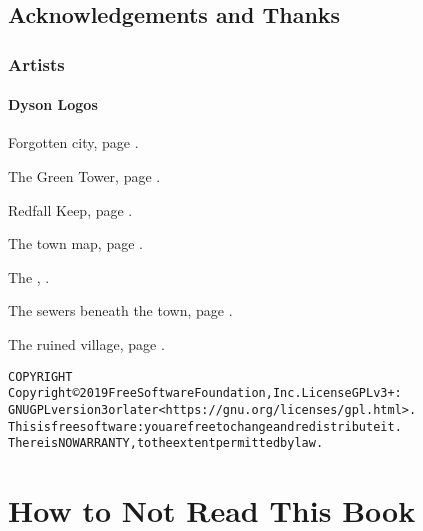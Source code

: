 
\section*{Acknowledgements and Thanks}

\subsection*{Artists}

\subsubsection{Dyson Logos}

Forgotten city, page \pageref{lost_city_map}.

The Green Tower, page \pageref{green_tower_map}.

Redfall Keep, page \pageref{redfall_keep_map}.

The town map, page \pageref{town_map}.

The , \pageref{mincing_pig_map}.

The sewers beneath the town, page \pageref{sewer_map}.

The ruined village, page \pageref{ruined_village_map}.

\begin{alltt}
COPYRIGHT
       Copyright \copyright 2019 Free Software Foundation, Inc.  License GPLv3+:
	GNU GPL version 3 or later <https://gnu.org/licenses/gpl.html>.
       This is free software: you are free to change and redistribute it.
	There is NO WARRANTY, to the extent permitted by law.

\end{alltt}

\chapter*{How to Not Read This Book}


